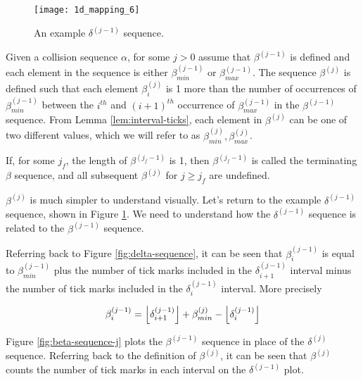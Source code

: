 \begin{figure}[H]
  \begin{center}
    \texttt{[image: 1d\_mapping\_6]}
  \end{center}
  \vspace{-.2in} %
  \caption{\label{fig:delta-sequence-2} An example $\delta^{(j-1)}$ sequence.}
\end{figure}

\begin{definition}
  \label{def:beta-definition}
  Given a collision sequence $\alpha$, for some $j > 0$ assume that $\beta^{(j-1)}$ is defined and each element in the sequence is either $\beta^{(j-1)}_{min}$ or $\beta^{(j-1)}_{max}$. The sequence $\beta^{(j)}$ is defined such that each element $\beta^{(j)}_i$ is 1 more than the number of occurrences of $\beta^{(j-1)}_{min}$ between the $i^{th}$ and $(i+1)^{th}$ occurrence of $\beta^{(j-1)}_{max}$ in the $\beta^{(j-1)}$ sequence. From Lemma \ref{lem:interval-ticks}, each element in $\beta^{(j)}$ can be one of two different values, which we will refer to as $\beta^{(j)}_{min}, \beta^{(j)}_{max}$.

  If, for some $j_f$, the length of $\beta^{(j_f-1)}$ is 1, then $\beta^{(j_f-1)}$ is called the terminating $\beta$ sequence, and all subsequent $\beta^{(j)}$ for $j \ge j_f$ are undefined.
\end{definition}

$\beta^{(j)}$ is much simpler to understand visually. Let's return to the example $\delta^{(j-1)}$ sequence, shown in Figure \ref{fig:delta-sequence-2}. We need to understand how the $\delta^{(j-1)}$ sequence is related to the $\beta^{(j-1)}$ sequence. 

Referring back to Figure \ref{fig:delta-sequence}, it can be seen that $\beta^{(j-1)}_i$ is equal to $\beta^{(j-1)}_{min}$ plus the number of tick marks included in the $\delta^{(j-1)}_{i+1}$ interval minus the number of tick marks included in the $\delta^{(j-1)}_i$ interval. More precisely

\begin{align}\label{eq:beta_i}
  \beta^{(j-1)}_i = \floor{\delta^{(j-1)}_{i+1}} + \beta^{(j)}_{min} - \floor{\delta^{(j-1)}_i} 
\end{align}

Figure \ref{fig:beta-sequence-j} plots the $\beta^{(j-1)}$ sequence in place of the $\delta^{(j)}$ sequence. Referring back to the definition of $\beta^{(j)}$, it can be seen that $\beta^{(j)}$ counts the number of tick marks in each interval on the $\delta^{(j-1)}$ plot.

